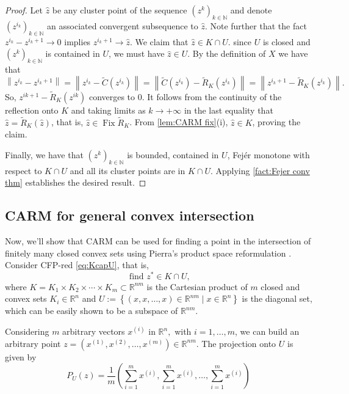 \documentclass[smallextended,numbook,nospthms]{svjour3}
\theoremstyle{plain}
\theoremstyle{definition}
\def\RR{\mathds R}
\def\NN{\mathds N}
\DeclareMathOperator{\Fix}{Fix}
\begin{document}
\begin{proof}
	Let $\hat{z}$ be any cluster point of the sequence $\left(z^{k}\right)_{k \in \NN}$ and denote $\left(z^{i_{k}}\right)_{k \in \NN}$ an associated convergent subsequence to $\hat{z}$. Note further that the fact $z^{i_{k}}-z^{i_{k}+1} \rightarrow 0$ implies $z^{i_{k}+1} \rightarrow \hat{z}$. We claim that $\hat{z} \in K \cap U$. since $U$ is closed and $\left(z^{k}\right)_{k \in \NN}$ is contained in $U$, we must have $\hat{z} \in U$. By the definition of $X$ we have that
	\begin{equation}
		\left\|z^{i_{k}}-z^{i_{k}+1}\right\|=\left\|z^{i_{k}}-\tilde{C}\left(z^{i_{k}}\right)\right\|=\left\|\tilde{C}\left(z^{i_{k}}\right)-\tilde{R}_{K}\left(z^{i_{k}}\right)\right\|=\left\|z^{i_{k}+1}-\tilde{R}_{K}\left(z^{i_{k}}\right)\right\|.
	\end{equation}
	So, $z^{i k+1}-\tilde{R}_{K}\left(z^{i k}\right)$ converges to $0$. It follows from the continuity of the reflection onto $K$ and taking limits as $k \rightarrow+\infty$ in the last equality that $\hat{z}=\tilde{R}_{K}(\hat{z})$, that is, $\hat{z} \in \Fix \tilde{R}_{K}$. From  \cref{lem:CARM fix}(i), $\hat{z} \in K$, proving the claim.
	
	Finally, we have that $\left(z^{k}\right)_{k \in \NN}$ is bounded, contained in $U$, Fejér monotone with respect to $K \cap U$  and all its cluster points are in $K \cap U$. Applying \cref{fact:Fejer conv thm} establishes the desired result.
\end{proof}

\subsection{CARM for general convex intersection}

Now, we'll show that CARM can be used for finding a point in the intersection of finitely many closed convex sets using Pierra's product space reformulation \cite{Pierra:1984hl}. Consider CFP-red \cref{eq:KcapU}, that is,
\[
\text{ find } z^{*}\in K\cap U, 
\]
where $K=K_{1} \times K_{2} \times \cdots \times K_{m}\subset \RR^{nm}$ is the Cartesian product of $m$ closed and convex sets $K_{i} \in \RR^n$ and $U :=\left\{(x, x, \ldots, x) \in \RR^{nm} \mid x \in \RR^{n}\right\}$ is the diagonal set, which can be easily shown to be a subspace of $\RR^{nm}$.

Considering $m$ arbitrary vectors $x^{(i)}$ in $\RR^{n},$ with $i=1, \ldots, m$, we can build an arbitrary point $z=\left(x^{(1)}, x^{(2)}, \ldots, x^{(m)}\right) \in \RR^{nm}$. The projection onto $U$ is given by
\begin{equation}
P_{U}(z)=\frac{1}{m}\left(\sum_{i=1}^{m} x^{(i)}, \sum_{i=1}^{m} x^{(i)}, \ldots, \sum_{i=1}^{m} x^{(i)}\right)
\end{equation}
\label{Pierra P_{U}}
\end{document}
